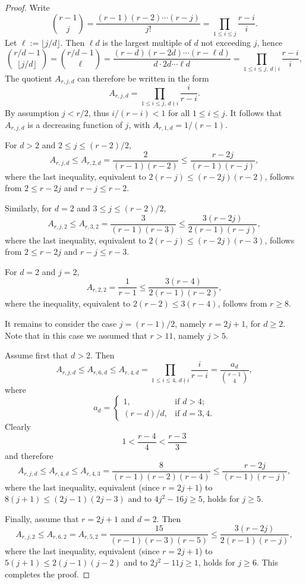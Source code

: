 \documentclass[10pt]{article}
\theoremstyle{definition}
\begin{document}
\begin{proof}
    Write
	\[
	   \binom{r-1}{j}
	   = \frac{(r-1)(r-2) \cdots (r-j)}{j!}
	   = \prod_{1 \le i \le j} \frac{r-i}{i}.
	\]
	Let $\ell := \lfloor j/d \rfloor$. Then $\ell d$ is the largest multiple of $d$ not exceeding $j$, hence
	\[
	   \binom{r/d - 1}{\lfloor j/d \rfloor} 
	   = \binom{r/d - 1}{\ell}
	   = \frac{(r-d)(r-2d)\cdots (r-\ell d)}{d \cdot 2d \cdots \ell d}
	   = \prod_{1 \le i \le j,\, d \mid i} \frac{r-i}{i},
	\]
	The quotient $A_{r,j,d}$ can therefore be written in the form
	\begin{equation*}
		A_{r,j,d} 
		= \prod_{1 \le i \le j,\, d \nmid i} \frac{i}{r-i}.
	\end{equation*}
	By assumption $j < r/2$, thus $i/(r-i) < 1$ for all $1 \le i \le j$. It follows that $A_{r,j,d}$ is a decreasing function of $j$, with $A_{r,1,d} = 1/(r-1)$.
    
    For $d > 2$ and $2 \le j \le (r-2)/2$,
    \[
        A_{r,j,d} \le A_{r,2,d} = \frac{2}{(r-1)(r-2)}
        \le \frac{r-2j}{(r-1)(r-j)},
    \]
    where the last inequality, equivalent to $2(r-j) \le (r-2j)(r-2)$, follows from $2 \le r-2j$ and $r-j \le r-2$. 
	
	Similarly, for $d=2$ and $3 \le j \le (r-2)/2$,
	\[
	   A_{r,j,2} \le A_{r,3,2} = \frac{3}{(r-1)(r-3)} 
	   \le \frac{3(r-2j)}{2(r-1)(r-j)},
	\]
	where the last inequality, equivalent to $2(r-j) \le (r-2j)(r-3)$, follows from $2 \le r-2j$ and $r-j \le r-3$.

    For $d = 2$ and $j = 2$,
    \[
        A_{r,2,2} = \frac{1}{r-1} \le \frac{3(r-4)}{2(r-1)(r-2)},
    \]
    where the inequality, equivalent to $2(r-2) \le 3(r-4)$, follows from $r \ge 8$.
        
	It remains to consider the case $j = (r-1)/2$, namely $r = 2j+1$, for $d \ge 2$.
	Note that in this case we assumed that $r > 11$, namely $j > 5$.
	
	Assume first that $d > 2$. Then 
	\[
        A_{r,j,d} \le A_{r,6,d} \le A_{r,4,d}
        = \prod_{1 \le i \le 4,\, d \nmid i} \frac{i}{r-i}
        = \frac{a_d}{\displaystyle\binom{r-1}{4}},
    \]
    where
    \[
        a_d =
        \begin{cases}
            1, &\text{if } d > 4; \\
            (r-d)/d, &\text{if } d = 3,4.
        \end{cases}
    \]
    Clearly	
	\[
	   1 < \frac{r-4}{4} < \frac{r-3}{3} 
	\]
	and therefore 
	\[
	   A_{r,j,d} \le A_{r,4,d} \le A_{r,4,3} 
	   = \frac{8}{(r-1)(r-2)(r-4)}
	   \le \frac{r-2j}{(r-1)(r-j)},
	\]
	where the last inequality, equivalent (since $r = 2j+1$) to $8(j+1) \le (2j-1)(2j-3)$ and to $4j^2 - 16j \ge 5$, holds for $j \ge 5$.
	
	Finally, assume that $r = 2j+1$ and $d = 2$.
	Then 
	\[
	   A_{r,j,2} \le A_{r,6,2} = A_{r,5,2} 
	   = \frac{15}{(r-1)(r-3)(r-5)}
	   \le \frac{3(r-2j)}{2(r-1)(r-j)},
	\]
	where the last inequality, equivalent (since $r = 2j+1$) to $5(j+1) \le 2(j-1)(j-2)$ and to $2j^2 - 11j \ge 1$, holds for $j \ge 6$.
	This completes the proof.
\end{proof}
	
\end{document}
